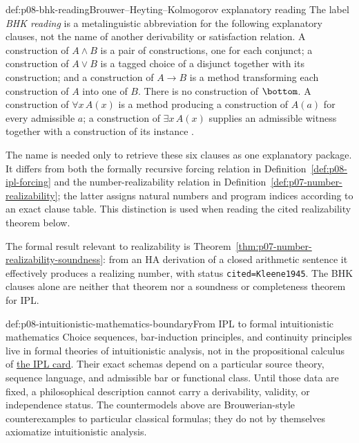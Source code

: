 \begin{hbdefinition}{def:p08-bhk-reading}{Brouwer--Heyting--Kolmogorov explanatory reading}
The label \emph{BHK reading} is a metalinguistic abbreviation for the
following explanatory clauses, not the name of another derivability or
satisfaction relation.  A construction of \(A\land B\) is a pair of
constructions, one for each conjunct; a construction of \(A\lor B\) is a
tagged choice of a disjunct together with its construction; and a construction
of \(A\to B\) is a method transforming each construction of \(A\) into one of
\(B\).  There is no construction of \(\bottom\).  A construction of
\(\forall x\,A(x)\) is a method producing a construction of \(A(a)\) for every
admissible \(a\); a construction of \(\exists x\,A(x)\) supplies an admissible
witness together with a construction of its instance
\cite{Brouwer1908,Heyting1956,TroelstraVanDalen1988}.

The name is needed only to retrieve these six clauses as one explanatory
package.  It differs from both the formally recursive forcing relation in
Definition~\ref{def:p08-ipl-forcing} and the number-realizability relation in
Definition~\ref{def:p07-number-realizability}; the latter assigns natural
numbers and program indices according to an exact clause table.  This
distinction is used when reading the cited realizability theorem below.
\end{hbdefinition}

The formal result relevant to realizability is
Theorem~\ref{thm:p07-number-realizability-soundness}: from an HA derivation of
a closed arithmetic sentence it effectively produces a realizing number, with
status \texttt{cited=Kleene1945}.  The BHK clauses alone are neither that
theorem nor a soundness or completeness theorem for IPL.

\begin{proofboundary}{def:p08-intuitionistic-mathematics-boundary}{From IPL to formal intuitionistic mathematics}
Choice sequences, bar-induction principles, and continuity principles live in
formal theories of intuitionistic analysis, not in the propositional calculus
of \hyperref[entry:p08-ipl]{the IPL card}.  Their exact schemas depend on a
particular source theory, sequence language, and admissible bar or functional
class.  Until those data are fixed, a philosophical description cannot carry
a derivability, validity, or independence status.  The countermodels above
are Brouwerian-style counterexamples to particular classical formulas; they do
not by themselves axiomatize intuitionistic analysis.
\end{proofboundary}


